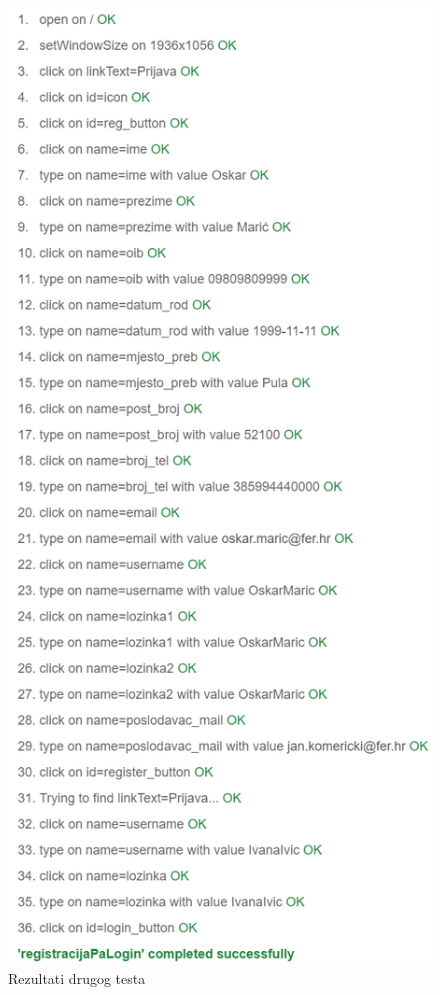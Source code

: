 \begin{enumerate}
\begin{figure}[H]
			 		\includegraphics[scale=0.6]{slike/testSustava3.PNG} %
			 		\centering
			 		\caption{Rezultati drugog testa}
			 		\label{fig:testsustava4}
			 	\end{figure}

\end{enumerate}
